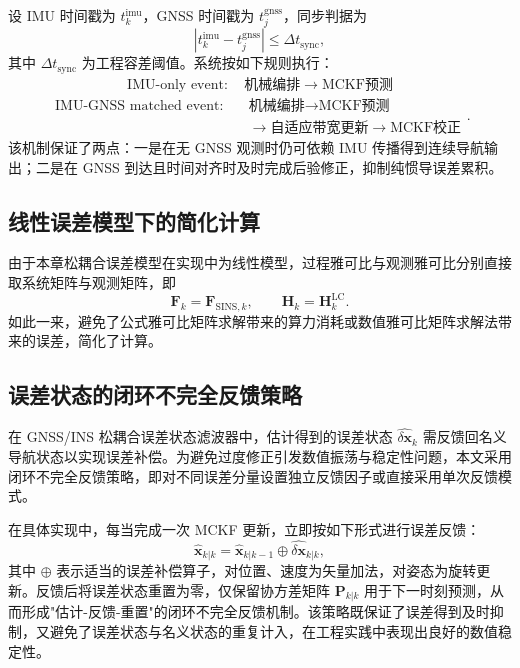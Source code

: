 设 IMU 时间戳为 $t_k^{\mathrm{imu}}$，GNSS 时间戳为 $t_j^{\mathrm{gnss}}$，同步判据为
\begin{equation}
	\left|t_k^{\mathrm{imu}}-t_j^{\mathrm{gnss}}\right|\leq \Delta t_{\mathrm{sync}},
	\label{eq:ch4_sync_rule}
\end{equation}
其中 $\Delta t_{\mathrm{sync}}$ 为工程容差阈值。系统按如下规则执行：
\begin{equation}
	\begin{aligned}
		\text{IMU-only event}:\quad
		\text{机械编排} \rightarrow \text{MCKF预测}
	\end{aligned}
\end{equation}
\begin{equation}
	\begin{aligned}
		\text{IMU-GNSS matched event}:\quad
		&\text{机械编排} \rightarrow \text{MCKF预测} \\
		&\rightarrow \text{自适应带宽更新} \rightarrow \text{MCKF校正}
	\end{aligned}
.
\end{equation}
该机制保证了两点：一是在无 GNSS 观测时仍可依赖 IMU 传播得到连续导航输出；二是在 GNSS 到达且时间对齐时及时完成后验修正，抑制纯惯导误差累积。

\subsection{线性误差模型下的简化计算}

由于本章松耦合误差模型在实现中为线性模型，过程雅可比与观测雅可比分别直接取系统矩阵与观测矩阵，即
\begin{equation}
	\bm{F}_k=\bm{F}_{\text{SINS},k},\qquad \bm{H}_k=\bm{H}^{\text{LC}}_k.
	\label{eq:ch4_linear_jacobian}
\end{equation}
如此一来，避免了公式雅可比矩阵求解带来的算力消耗或数值雅可比矩阵求解法带来的误差，简化了计算。

\subsection{误差状态的闭环不完全反馈策略}

在 GNSS/INS 松耦合误差状态滤波器中，估计得到的误差状态 $\hat{\delta\bm{x}}_k$ 需反馈回名义导航状态以实现误差补偿。为避免过度修正引发数值振荡与稳定性问题，本文采用闭环不完全反馈策略，即对不同误差分量设置独立反馈因子或直接采用单次反馈模式。

在具体实现中，每当完成一次 MCKF 更新，立即按如下形式进行误差反馈：
\begin{equation}
	\hat{\bm{x}}_{k|k} = \hat{\bm{x}}_{k|k-1} \oplus \hat{\delta\bm{x}}_{k|k},
\end{equation}
其中 $\oplus$ 表示适当的误差补偿算子，对位置、速度为矢量加法，对姿态为旋转更新。反馈后将误差状态重置为零，仅保留协方差矩阵 $\bm{P}_{k|k}$ 用于下一时刻预测，从而形成"估计-反馈-重置"的闭环不完全反馈机制。该策略既保证了误差得到及时抑制，又避免了误差状态与名义状态的重复计入，在工程实践中表现出良好的数值稳定性。

